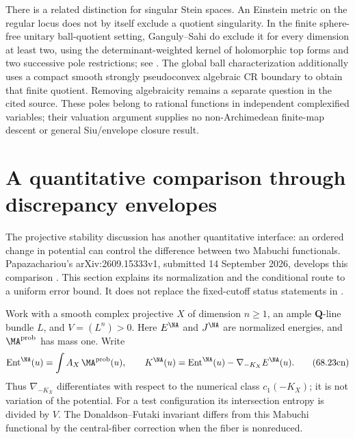 There is a related distinction for singular Stein spaces.
An Einstein metric on the regular locus does not by itself
exclude a quotient singularity. In the finite sphere-free
unitary ball-quotient setting, Ganguly--Sahi do exclude it
for every dimension at least two, using the determinant-weighted
kernel of holomorphic top forms and two successive pole
restrictions; see .
The global ball characterization additionally uses a compact
smooth strongly pseudoconvex algebraic CR boundary to obtain
that finite quotient. Removing algebraicity remains a separate
question in the cited source. These poles belong to rational
functions in independent complexified variables; their valuation
argument supplies no non-Archimedean finite-map descent or
general Siu/envelope closure result.

\section{A quantitative comparison through discrepancy envelopes}
\label{sec:ytd-Khat-Kbeta}

The projective stability discussion has another quantitative interface:
an ordered change in potential can control the difference between
two Mabuchi functionals. Papazachariou's
arXiv:2609.15333v1, submitted 14 September 2026,
develops this comparison \cite{Papazachariou26KhatKbetaV1}.
This section explains its normalization and the conditional route to
a uniform error bound. It does not replace the fixed-cutoff status
statements in .

Work with a smooth complex projective $X$ of dimension $n\geq1$,
an ample $\mathbf Q$-line bundle $L$, and $V=(L^n)>0$.
Here $E^{\NA}$ and $J^{\NA}$ are normalized energies, and
$\MA^{\mathrm{prob}}$ has mass one. Write
\[
 \operatorname{Ent}^{\NA}(u)
       =\int A_X\,\MA^{\mathrm{prob}}(u),
 \qquad
 K^{\NA}(u)=\operatorname{Ent}^{\NA}(u)
                     -\nabla_{-K_X}E^{\NA}(u).
\tag{68.23cn}\label{eq:ytd-Khat-Kbeta-Mabuchi}
\]
Thus $\nabla_{-K_X}$ differentiates with respect to the numerical
class $c_1(-K_X)$; it is not variation of the potential.
For a test configuration its intersection entropy is divided by $V$.
The Donaldson--Futaki invariant differs from this Mabuchi functional
by the central-fiber correction when the fiber is nonreduced.

